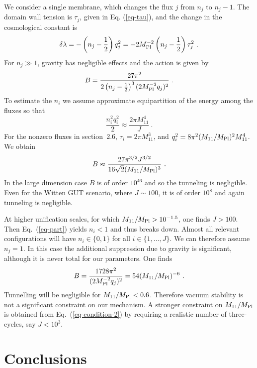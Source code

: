 \documentclass[12pt]{article}
\newcommand{\sect}[1]{\setcounter{equation}{0}\section{#1}}
\begin{document}
We consider a single membrane, which changes the flux $j$ from $n_j$
to $n_j -1$.  The domain wall tension is $\tau_j$, given in
Eq. (\ref{eq-tau}), and the change in the cosmological constant is
\begin{equation}
\delta\lambda = -\left(n_j - \frac{1}{2}\right) q_j^2 = -2 M_{\rm
Pl}^{-2} \left(n_j-\frac{1}{2}\right) \tau_j^2\ .
\end{equation}
For $n_j \gg 1$, gravity has negligible effects and the action is
given by
\begin{equation}
B = \frac{27\pi^2}{2 \left(n_j - \frac{1}{2}\right)^3 (2
M_{\rm Pl}^{-2} q_j)^2} \ .
\end{equation}
To estimate the $n_i$ we assume approximate equipartition of the
energy among the fluxes so that
\begin{equation}
\frac{n_i^2 q_i^2}{2} \approx \frac{2\pi M_{11}^4}{J}\ .
\label{eq-part}
\end{equation}
For the nonzero fluxes in section~2.6, $\tau_i = 2\pi M_{11}^3$, and
$q_i^2 = 8 \pi^2 (M_{11}/M_{\rm Pl})^2 M_{11}^4$.  We obtain
\begin{equation}
B \approx \frac{27 \pi^{3/2} J^{3/2}}{16 \sqrt{2} (M_{11}/M_{\rm
Pl})^3}\ .
\end{equation}
In the large dimension case $B$ is of order $10^{46}$ and so the
tunneling is negligible.  Even for the Witten GUT scenario, where $J
\sim 100$, it is of order $10^8$ and again tunneling is negligible.

At higher unification scales, for which $M_{11}/M_{\rm Pl}>10^{-1.5}$,
one finds $J > 100$.  Then Eq.~(\ref{eq-part}) yields $n_i<1$ and thus
breaks down.  Almost all relevant configurations will have $n_i \in
\{0,1\}$ for all $i \in \{1, \ldots, J\}$.  We can therefore assume
$n_j = 1$.  In this case the additional suppression due to gravity is
significant, although it is never total for our parameters.  One finds
\begin{equation}
B = \frac{1728 \pi^2}{(2 M_{\rm Pl}^{-2} q_j)^2}
  = 54 ( M_{11}/M_{\rm Pl} )^{-6}\ .
\end{equation}
Tunnelling will be negligible for $M_{11}/M_{\rm Pl} < 0.6$.  Therefore
vacuum stability is not a significant constraint on our mechanism.  A
stronger constraint on $ M_{11}/M_{\rm Pl} $ is obtained from
Eq.~(\ref{eq-condition-2}) by requiring a realistic number of
three-cycles, say $J<10^3$.





\sect{Conclusions}
\label{sec-summary}
\end{document}

